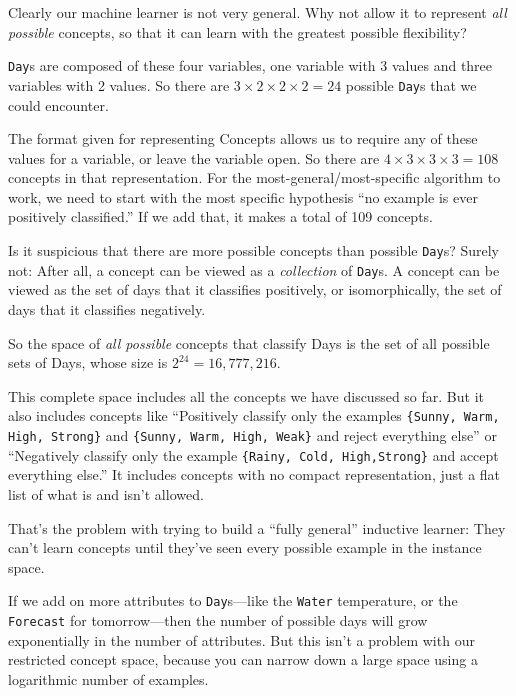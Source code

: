 {
 Clearly our machine learner is not very general. Why not allow it
to represent \textit{all possible} concepts, so that it can learn with
the greatest possible flexibility?}

{
 \texttt{Day}s are composed of these four variables, one variable with 3
values and three variables with 2 values. So there are $3 \times 2
\times 2 \times 2 = 24$ possible \texttt{Day}s that we could
encounter.}

{
 The format given for representing Concepts allows us to require
any of these values for a variable, or leave the variable open. So
there are $4 \times 3 \times 3 \times 3 = 108$ concepts
in that representation. For the most-general/most-specific algorithm to
work, we need to start with the most specific hypothesis
``no example is ever positively
classified.'' If we add that, it makes a total of 109
concepts.}

{
 Is it suspicious that there are more possible concepts than
possible \texttt{Day}s? Surely not: After all, a concept can be viewed as a
\textit{collection} of \texttt{Day}s. A concept can be viewed as the set of days
that it classifies positively, or isomorphically, the set of days that
it classifies negatively.}

{
 So the space of \textit{all possible} concepts that classify Days
is the set of all possible sets of Days, whose size is
$2^{24} = 16,777,216$.}

{
 This complete space includes all the concepts we have discussed so
far. But it also includes concepts like ``Positively
classify only the examples \texttt{\{Sunny, Warm, High, Strong\}} and
\texttt{\{Sunny, Warm, High, Weak\}} and reject everything
else'' or ``Negatively classify only
the example \texttt{\{Rainy, Cold, High,Strong\}} and accept everything
else.'' It includes concepts with no compact
representation, just a flat list of what is and isn't
allowed.}

{
 That's the problem with trying to build a
``fully general'' inductive learner:
They can't learn concepts until they've
seen every possible example in the instance space.}

{
 If we add on more attributes to \texttt{Day}s---like the \texttt{Water} temperature,
or the \texttt{Forecast} for tomorrow---then the number of possible days will
grow exponentially in the number of attributes. But this
isn't a problem with our restricted concept space,
because you can narrow down a large space using a logarithmic number of
examples.}

